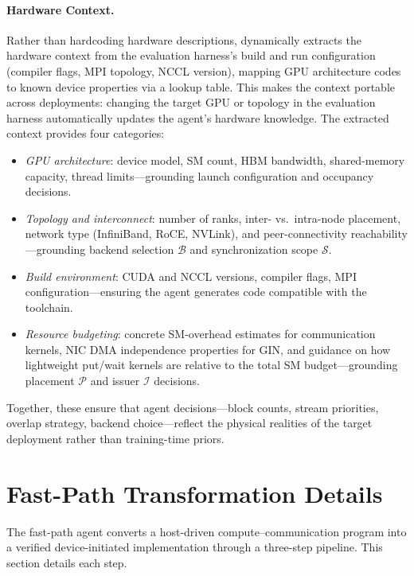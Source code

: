 \paragraph{Hardware Context.}
Rather than hardcoding hardware descriptions, \cufuse{} dynamically extracts the hardware context from the evaluation harness's build and run configuration (compiler flags, MPI topology, NCCL version), mapping GPU architecture codes to known device properties via a lookup table. This makes the context portable across deployments: changing the target GPU or topology in the evaluation harness automatically updates the agent's hardware knowledge. The extracted context provides four categories:
\begin{itemize}[leftmargin=1.4em,itemsep=1pt,topsep=2pt]
\item \emph{GPU architecture}: device model, SM count, HBM bandwidth, shared-memory capacity, thread limits---grounding launch configuration and occupancy decisions.
\item \emph{Topology and interconnect}: number of ranks, inter- vs.\ intra-node placement, network type (InfiniBand, RoCE, NVLink), and peer-connectivity reachability---grounding backend selection $\mathcal{B}$ and synchronization scope $\mathcal{S}$.
\item \emph{Build environment}: CUDA and NCCL versions, compiler flags, MPI configuration---ensuring the agent generates code compatible with the toolchain.
\item \emph{Resource budgeting}: concrete SM-overhead estimates for communication kernels, NIC DMA independence properties for GIN, and guidance on how lightweight put/wait kernels are relative to the total SM budget---grounding placement $\mathcal{P}$ and issuer $\mathcal{I}$ decisions.
\end{itemize}
Together, these ensure that agent decisions---block counts, stream priorities, overlap strategy, backend choice---reflect the physical realities of the target deployment rather than training-time priors.


\section{Fast-Path Transformation Details}\label{sec:fast_path_details}

The fast-path agent converts a host-driven compute--communication program into a verified device-initiated implementation through a three-step pipeline. This section details each step.

